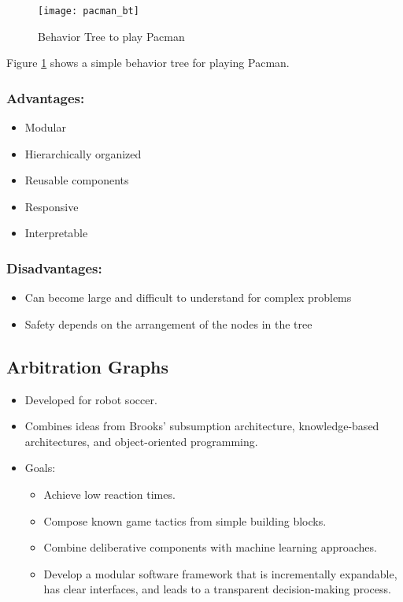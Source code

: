 \begin{figure}
  \centering
  \texttt{[image: pacman\_bt]}

  \caption{Behavior Tree to play Pacman}%
  \label{fig:pacman_bt}
\end{figure}

Figure \ref{fig:pacman_bt} shows a simple behavior tree for playing Pacman.

\subsubsection*{Advantages:}
\begin{itemize}
    \item Modular
    \item Hierarchically organized
    \item Reusable components
    \item Responsive
    \item Interpretable
\end{itemize}

\subsubsection*{Disadvantages:}
\begin{itemize}
    \item Can become large and difficult to understand for complex problems
    \item Safety depends on the arrangement of the nodes in the tree
\end{itemize}

\subsection*{Arbitration Graphs}

\begin{itemize}
    \item Developed for robot soccer.
    \item Combines ideas from Brooks' subsumption architecture, knowledge-based architectures, and object-oriented programming.
    \item Goals:
          \begin{itemize}
              \item Achieve low reaction times.
              \item Compose known game tactics from simple building blocks.
              \item Combine deliberative components with machine learning approaches.
              \item Develop a modular software framework that is incrementally expandable, has clear interfaces, and leads to a transparent decision-making process.
          \end{itemize}
\end{itemize}

